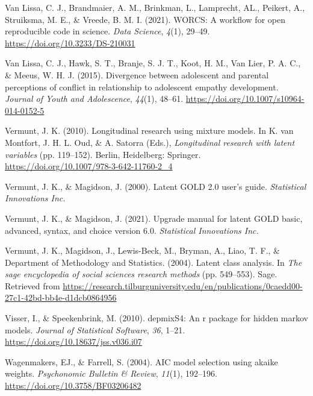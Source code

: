 \documentclass[
  ,man,floatsintext]{apa6}
\newlength{\cslhangindent}
\newlength{\cslentryspacingunit} %
\newenvironment{CSLReferences}[2] %
 {%
  \setlength{\parindent}{0pt}
  \ifodd #1
  \let\oldpar\par
  \def\par{\hangindent=\cslhangindent\oldpar}
  \fi
  \setlength{\parskip}{#2\cslentryspacingunit}
 }%
 {}
\begin{document}
\begin{CSLReferences}{1}{0}
\leavevmode{}%
Van Lissa, C. J., Brandmaier, A. M., Brinkman, L., Lamprecht, AL., Peikert, A., Struiksma, M. E., \& Vreede, B. M. I. (2021). {WORCS}: A workflow for open reproducible code in science. \emph{Data Science}, \emph{4}(1), 29--49. \url{https://doi.org/10.3233/DS-210031}

\leavevmode{}%
Van Lissa, C. J., Hawk, S. T., Branje, S. J. T., Koot, H. M., Van Lier, P. A. C., \& Meeus, W. H. J. (2015). Divergence between adolescent and parental perceptions of conflict in relationship to adolescent empathy development. \emph{Journal of Youth and Adolescence}, \emph{44}(1), 48--61. \url{https://doi.org/10.1007/s10964-014-0152-5}

\leavevmode{}%
Vermunt, J. K. (2010). Longitudinal research using mixture models. In K. van Montfort, J. H. L. Oud, \& A. Satorra (Eds.), \emph{Longitudinal research with latent variables} (pp. 119--152). Berlin, Heidelberg: Springer. \url{https://doi.org/10.1007/978-3-642-11760-2_4}

\leavevmode{}%
Vermunt, J. K., \& Magidson, J. (2000). Latent {GOLD} 2.0 user's guide. \emph{Statistical Innovations Inc.}

\leavevmode{}%
Vermunt, J. K., \& Magidson, J. (2021). Upgrade manual for latent {GOLD} basic, advanced, syntax, and choice version 6.0. \emph{Statistical Innovations Inc.}

\leavevmode{}%
Vermunt, J. K., Magidson, J., Lewis-Beck, M., Bryman, A., Liao, T. F., \& Department of Methodology and Statistics. (2004). Latent class analysis. In \emph{The sage encyclopedia of social sciences research methods} (pp. 549--553). Sage. Retrieved from \url{https://research.tilburguniversity.edu/en/publications/0caedd00-27c1-42bd-bb4e-d1dcb0864956}

\leavevmode{}%
Visser, I., \& Speekenbrink, M. (2010). {depmixS}4: An r package for hidden markov models. \emph{Journal of Statistical Software}, \emph{36}, 1--21. \url{https://doi.org/10.18637/jss.v036.i07}

\leavevmode{}%
Wagenmakers, EJ., \& Farrell, S. (2004). {AIC} model selection using akaike weights. \emph{Psychonomic Bulletin \& Review}, \emph{11}(1), 192--196. \url{https://doi.org/10.3758/BF03206482}


\end{CSLReferences}
\end{document}
